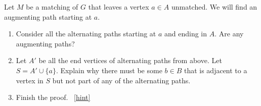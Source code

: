 \documentclass{book}
\begin{document}
\setcounter{project}{60}
\addtocounter{project}{-1}
\begin{activity}[]\label{activity-53}
\hypertarget{p-480}{}%
Let \(M\) be a matching of \(G\) that leaves a vertex \(a \in A\) unmatched.  We will find an augmenting path starting at \(a\).%
\begin{enumerate}[font=\bfseries,label=(\alph*),ref=\alph*]
\item\label{task-66} \hypertarget{p-481}{}%
Consider all the alternating paths starting at \(a\) and ending in \(A\).  Are any augmenting paths?%
\item\label{task-67} \hypertarget{p-482}{}%
Let \(A'\) be all the end vertices of alternating paths from above.  Let \(S = A' \cup \{a\}\).  Explain why there must be some \(b \in B\) that is adjacent to a vertex in \(S\) but not part of any of the alternating paths.%
\item\label{task-68} \hypertarget{p-483}{}%
Finish the proof.%
~\hfill{\tiny\hyperlink{a-60.c}{[hint]}\hypertarget{q-60.c}{}}\end{enumerate}
\end{activity}
\end{document}
